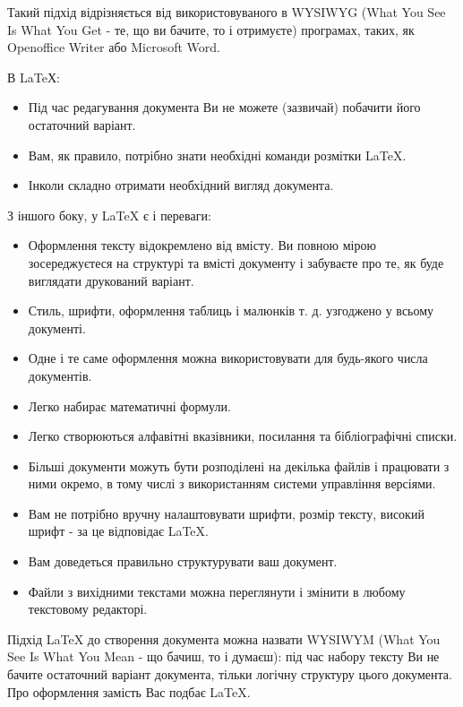 	Такий підхід відрізняється від використовуваного в WYSIWYG (What You See Is What You Get - те, що ви бачите, то і отримуєте) програмах, таких, як Openoffice Writer або Microsoft Word.
	
	В LaTeХ: 
	
	\begin{itemize}
		\item Під час редагування документа Ви не можете (зазвичай) побачити його остаточний варіант.
		
		\item 	Вам, як правило, потрібно знати необхідні команди розмітки LaTeX.
		
		\item Інколи складно отримати необхідний вигляд документа.
		
	\end{itemize}


		З іншого боку, у LaTeX є і переваги:
		
	\begin{itemize}
		\item Оформлення тексту відокремлено від вмісту. Ви повною мірою зосереджуєтеся на структурі та вмісті документу і забуваєте про те, як буде виглядати друкований варіант.
		\item Стиль, шрифти, оформлення таблиць і малюнків т. д. узгоджено у всьому документі.
		\item Одне і те саме оформлення можна використовувати для будь-якого числа документів.
		\item Легко набирає математичні формули.
		\item Легко створюються алфавітні вказівники, посилання та бібліографічні списки.
		\item Більші документи можуть бути розподілені на декілька файлів і працювати з ними окремо, в тому числі з використанням системи управління версіями.
		\item Вам не потрібно вручну налаштовувати шрифти, розмір тексту, високий шрифт - за це відповідає  LaTeX.
		\item  Вам доведеться правильно структурувати ваш документ.
		\item Файли з вихідними текстами можна переглянути і змінити в любому текстовому редакторі.
	
	\end{itemize}

	Підхід LaTeX до створення документа можна назвати WYSIWYM (What You See Is What You Mean - що бачиш, то і думаєш): під час набору тексту Ви не бачите остаточний варіант документа, тільки логічну структуру цього документа. Про оформлення замість Вас подбає LaTeX.

	
		